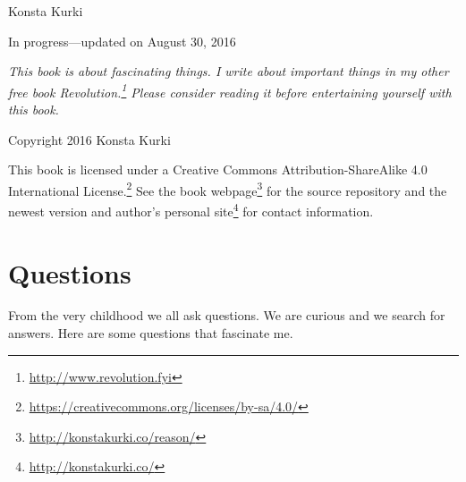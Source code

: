 \documentclass[11pt,oneside,%
]{memoir}
\theoremstyle{definition}
\begin{document}
\frontmatter

\thispagestyle{empty}


\vspace{0.3in}

\noindent Konsta Kurki

\vspace{0.3in}

\noindent In progress---updated on August 30, 2016

\vfill

\noindent\emph{This book is about fascinating things. I write about important things in my other free book \emph{Revolution}.\footnote{\url{http://www.revolution.fyi}} Please consider reading it before entertaining yourself with this book.}

\vfill

\noindent Copyright {\textcopyright} 2016 Konsta Kurki

\vspace{0.18in}

\noindent This book is licensed under a Creative Commons Attribution-ShareAlike 4.0 International License.\footnote{\url{https://creativecommons.org/licenses/by-sa/4.0/}} See the book webpage\footnote{\url{http://konstakurki.co/reason/}} for the source repository and the newest version and author's personal site\footnote{\url{http://konstakurki.co/}} for contact information.

\newpage

\mainmatter

\tableofcontents

\chapter{Questions}

From the very childhood we all ask questions. We are curious and we search for answers. Here are some questions that fascinate me.
\end{document}
